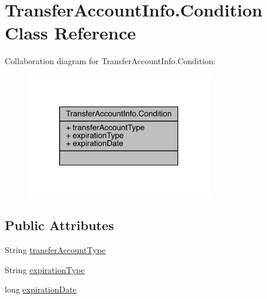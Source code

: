 \hypertarget{classcom_1_1toast_1_1android_1_1gamebase_1_1auth_1_1transfer_1_1data_1_1_transfer_account_info_1_1_condition}{}\section{Transfer\+Account\+Info.\+Condition Class Reference}
\label{classcom_1_1toast_1_1android_1_1gamebase_1_1auth_1_1transfer_1_1data_1_1_transfer_account_info_1_1_condition}


Collaboration diagram for Transfer\+Account\+Info.\+Condition\+:
\nopagebreak
\begin{figure}[H]
\begin{center}
\leavevmode
\includegraphics[width=231pt]{classcom_1_1toast_1_1android_1_1gamebase_1_1auth_1_1transfer_1_1data_1_1_transfer_account_info_1_1_condition__coll__graph}
\end{center}
\end{figure}
\subsection*{Public Attributes}
\begin{DoxyCompactItemize}
\item 
String \hyperlink{classcom_1_1toast_1_1android_1_1gamebase_1_1auth_1_1transfer_1_1data_1_1_transfer_account_info_1_1_condition_a747b6e611e9c1a55797b2790f1b92667}{transfer\+Account\+Type}
\item 
String \hyperlink{classcom_1_1toast_1_1android_1_1gamebase_1_1auth_1_1transfer_1_1data_1_1_transfer_account_info_1_1_condition_ab59eb8f45d9d22344cd80851af973c46}{expiration\+Type}
\item 
long \hyperlink{classcom_1_1toast_1_1android_1_1gamebase_1_1auth_1_1transfer_1_1data_1_1_transfer_account_info_1_1_condition_a7fd6bc57285184877bc741714381e0a6}{expiration\+Date}
\end{DoxyCompactItemize}


